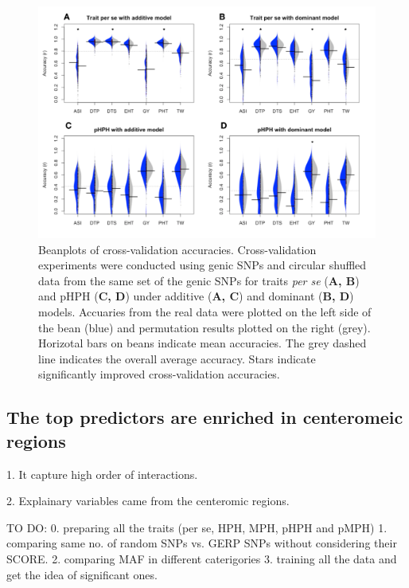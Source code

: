 \documentclass[9pt,twocolumn,twoside]{gsajnl}
\begin{document}
\begin{figure}[htbp]
\centering
\includegraphics[width=\linewidth]{Figure_cvres.pdf}
\caption{Beanplots of cross-validation accuracies. Cross-validation experiments were conducted using genic SNPs and circular shuffled data from the same set of the genic SNPs for traits \emph{per se} (\textbf{A, B}) and pHPH (\textbf{C, D}) under additive (\textbf{A, C}) and dominant (\textbf{B, D}) models. Accuaries from the real data were plotted on the left side of the bean (blue) and permutation results plotted on the right (grey). Horizotal bars on beans indicate mean accuracies. The grey dashed line indicates the overall average accuracy. Stars indicate significantly improved cross-validation accuracies.}
\label{fig:beanplot}
\end{figure}

\subsection*{The top predictors are enriched in centeromeic regions}

1. It capture high order of interactions.  

2. Explainary variables came from the centeromic regions.

TO DO:
0. preparing all the traits (per se, HPH, MPH, pHPH and pMPH)
1. comparing same no. of random SNPs vs. GERP SNPs without considering their SCORE.
2. comparing MAF in different caterigories
3. training all the data and get the idea of significant ones.



\end{document}
